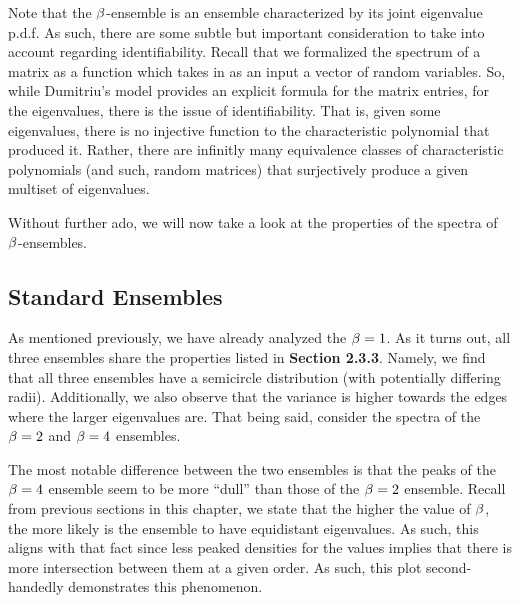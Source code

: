 \begin{remark}
Note that the  $\beta$-ensemble is an ensemble characterized by its joint eigenvalue p.d.f.
As such, there are some subtle but important consideration to take into account regarding identifiability.
Recall that we formalized the spectrum of a matrix as a function which takes in as an input a vector of random variables.
So, while Dumitriu's model provides an explicit formula for the matrix entries, for the eigenvalues, there is the issue of identifiability.
That is, given some eigenvalues, there is no injective function to the characteristic polynomial that produced it.
Rather, there are infinitly many equivalence classes of characteristic polynomials (and such, random matrices) that surjectively produce a given multiset of eigenvalues.
\end{remark}

Without further ado, we will now take a look at the properties of the spectra of $\beta$-ensembles.


\subsection{Standard Ensembles}

As mentioned previously, we have already analyzed the $\beta = 1$. As it turns out, all three ensembles share the properties listed in \textbf{Section 2.3.3}. Namely, we find that all three ensembles have a semicircle distribution (with potentially differing radii). Additionally, we also observe that the variance is higher towards the edges where the larger eigenvalues are. That being said, consider the spectra of the $\beta = 2$ and $\beta = 4$ ensembles.
\trim
{}

\newpage

The most notable difference between the two ensembles is that the peaks of the $\beta = 4$ ensemble seem to be more ``dull'' than those of the $\beta = 2$ ensemble. Recall from previous sections in this chapter, we state that the higher the value of $\beta$, the more likely is the ensemble to have equidistant eigenvalues. As such, this aligns with that fact since less peaked densities for the values implies that there is more intersection between them at a given order. As such, this plot second-handedly demonstrates this phenomenon.

